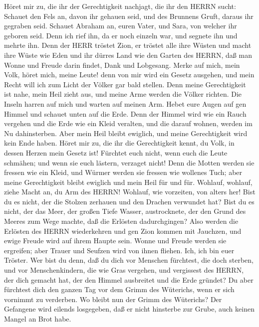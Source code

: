  Höret mir zu, die ihr der Gerechtigkeit nachjagt, die ihr
den HERRN sucht: Schauet den Fels an, davon ihr gehauen seid, und des
Brunnens Gruft, daraus ihr gegraben seid.  Schauet Abraham
an, euren Vater, und Sara, von welcher ihr geboren seid. Denn ich rief
ihn, da er noch einzeln war, und segnete ihn und mehrte ihn.
 Denn der HERR tröstet Zion, er tröstet alle ihre Wüsten und
macht ihre Wüste wie Eden und ihr dürres Land wie den Garten des HERRN,
daß man Wonne und Freude darin findet, Dank und Lobgesang. 
Merke auf mich, mein Volk, höret mich, meine Leute! denn von mir wird
ein Gesetz ausgehen, und mein Recht will ich zum Licht der Völker gar
bald stellen.  Denn meine Gerechtigkeit ist nahe, mein Heil
zieht aus, und meine Arme werden die Völker richten. Die Inseln harren
auf mich und warten auf meinen Arm.  Hebet eure Augen auf
gen Himmel und schauet unten auf die Erde. Denn der Himmel wird wie ein
Rauch vergehen und die Erde wie ein Kleid veralten, und die darauf
wohnen, werden im Nu dahinsterben. Aber mein Heil bleibt ewiglich, und
meine Gerechtigkeit wird kein Ende haben.  Höret mir zu, die
ihr die Gerechtigkeit kennt, du Volk, in dessen Herzen mein Gesetz ist!
Fürchtet euch nicht, wenn euch die Leute schmähen; und wenn sie euch
lästern, verzaget nicht!  Denn die Motten werden sie fressen
wie ein Kleid, und Würmer werden sie fressen wie wollenes Tuch; aber
meine Gerechtigkeit bleibt ewiglich und mein Heil für und für.
 Wohlauf, wohlauf, ziehe Macht an, du Arm des HERRN!
Wohlauf, wie vorzeiten, von alters her! Bist du es nicht, der die
Stolzen zerhauen und den Drachen verwundet hat?  Bist du es
nicht, der das Meer, der großen Tiefe Wasser, austrocknete, der den
Grund des Meeres zum Wege machte, daß die Erlösten dadurchgingen?
 Also werden die Erlösten des HERRN wiederkehren und gen
Zion kommen mit Jauchzen, und ewige Freude wird auf ihrem Haupte sein.
Wonne und Freude werden sie ergreifen; aber Trauer und Seufzen wird von
ihnen fliehen.  Ich, ich bin euer Tröster. Wer bist du
denn, daß du dich vor Menschen fürchtest, die doch sterben, und vor
Menschenkindern, die wie Gras vergehen,  und vergissest des
HERRN, der dich gemacht hat, der den Himmel ausbreitet und die Erde
gründet? Du aber fürchtest dich den ganzen Tag vor dem Grimm des
Wüterichs, wenn er sich vornimmt zu verderben. Wo bleibt nun der Grimm
des Wüterichs?  Der Gefangene wird eilends losgegeben, daß
er nicht hinsterbe zur Grube, auch keinen Mangel an Brot habe.
